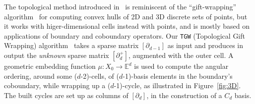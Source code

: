 \documentclass{juliacon}
\def\E{\mathbb{E}}
\begin{document}
The topological method introduced in~\cite{TSAS:17} is reminiscent of the ``gift-wrapping'' algorithm~\cite{Cormen:2009:IAT:1614191,Jarvis:1973:ICH} for computing convex hulls of 2D and 3D discrete sets of points, but it works with higer-dimensional cells instead with points, and is mostly based on applications of boundary and coboundary operators. Our \texttt{TGW} (Topological Gift Wrapping) algorithm~\cite{TSAS:17} takes a sparse matrix $[\partial_{d-1}]$ as input and produces in output the \emph{unknown} sparse matrix  $[\partial_{d}^+]$, augmented with the outer cell. A geometric embedding function $\mu: X_0\to\E^d$ is used to compute the angular ordering, around some ($d$-2)-cells, of ($d$-1)-basis elements in the boundary's coboundary, while wrapping up a ($d$-1)-cycle, as illustrated in Figure~\ref{fig:3D}. The built cycles are set up as columns of $[\partial_d]$, in the construction of a $C_d$ basis.
\end{document}
